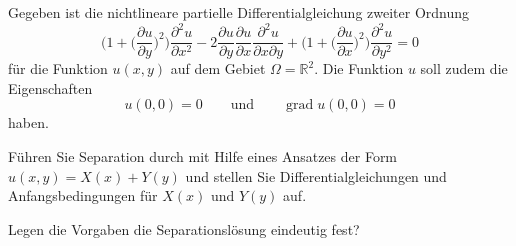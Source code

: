 Gegeben ist die nichtlineare partielle Differentialgleichung 
zweiter Ordnung
\begin{equation}
\biggl(1+\biggl(\frac{\partial u}{\partial y}\biggr)^2\biggr)
\frac{\partial^2 u}{\partial x^2}
-2
\frac{\partial u}{\partial y}
\frac{\partial u}{\partial x}
\frac{\partial^2 u}{\partial x\partial y}
+
\biggl(1+\biggl(\frac{\partial u}{\partial x}\biggr)^2\biggr)
\frac{\partial^2 u}{\partial y^2}
=0
\label{40000016:dgl}
\end{equation}
für die Funktion $u(x,y)$ auf dem Gebiet $\Omega =\mathbb R^2$.
Die Funktion $u$ soll zudem die Eigenschaften
\[
u(0,0)=0
\qquad\text{und}\qquad
\operatorname{grad} u(0,0)=0
\]
haben.
\begin{teilaufgaben}
\item
Führen Sie Separation durch mit Hilfe eines Ansatzes der Form
$
u(x,y) = X(x) + Y(y)
$
und stellen Sie Differentialgleichungen und Anfangsbedingungen
für $X(x)$ und $Y(y)$ auf.
\item
Legen die Vorgaben die Separationslösung eindeutig fest?
\end{teilaufgaben}

